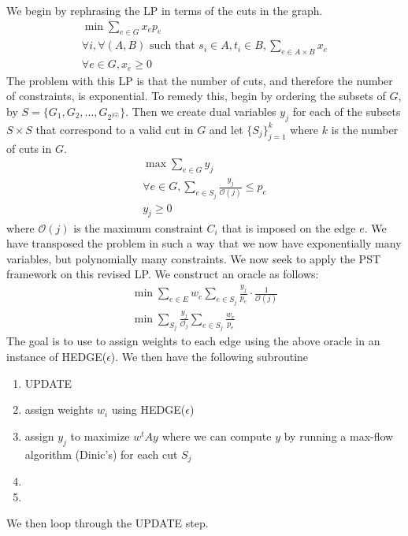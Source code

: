 \documentclass{article}
\newcommand{\problem}[1]{\noindent {\bf #1}}
\newcommand{\problempart}[1]{\noindent{\textbf{(#1)}}}
\begin{document}
\problempart{b}
We begin by rephrasing the LP in terms of the cuts in the graph. 
\begin{align*}
\min \sum_{e \in G} x_ep_e \\
\forall i, \forall (A,B) \text{ such that } s_i \in A, t_i \in B, \sum_{e \in A \times B} x_e \\
\forall e \in G,  x_e \geq 0
\end{align*}
The problem with this LP is that the number of cuts, and therefore the number of constraints, is exponential. To remedy this, begin by ordering the subsets of $G$, by $S = \{G_1, G_2, \ldots, G_{2^{|G|}}\}$. Then we create dual variables $y_j$ for each of the subsets $S \times S$ that correspond to a valid cut in $G$ and let $\{S_j\}_{j=1}^k$ where $k$ is the number of cuts in $G$.  
\begin{align*}
\max \sum_{e \in G} y_j \\
\forall e \in G, \sum_{e \in S_j} \frac{y_j}{\mathcal{O}(j)} \leq p_e \\
y_j \geq 0 
\end{align*}
where $\mathcal{O}(j)$ is the maximum constraint $C_i$ that is imposed on the edge $e$. We have transposed the problem in such a way that we now have exponentially many variables, but polynomially many constraints. We now seek to apply the PST framework on this revised LP. We construct an oracle as follows:
\begin{align*}
\min \sum_{e\in E} w_e \sum_{e\in S_j} \frac{y_j}{p_e}\cdot \frac{1}{\mathcal{O}(j)} \\
\min \sum_{S_j} \frac{y_j}{\mathcal{O}_j} \sum_{e \in S_j} \frac{w_e}{p_e}
\end{align*}
The goal is to use to assign weights to each edge using the above oracle in an instance of HEDGE($\epsilon$). We then have the following subroutine

\begin{enumerate}
\item UPDATE
\item assign weights $w_i$ using HEDGE($\epsilon$)
\item assign $y_j$ to maximize $w^tAy$ where we can compute $y$ by running a max-flow algorithm (Dinic's) for each cut $S_j$
\item 
\item
\end{enumerate}
We then loop through the UPDATE step. 

\problem{Problem 3.}
\problempart{a} 

\problempart{b}
\end{document}
